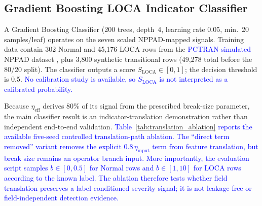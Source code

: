 \documentclass[journal]{IEEEtran}
\newcommand{\added}[1]{\textcolor{blue}{#1}}
\begin{document}
\begin{table}[htbp]
\caption{NPPAD-Mapped Indicators: Qualitative Trend Under Increasing LOCA Severity (Mapped proxy values from synthetic benchmark; not raw plant measurements.)}
\label{tab:nppad}
\centering
{}
\end{table}

\subsection{Gradient Boosting LOCA Indicator Classifier}

A Gradient Boosting Classifier (200 trees, depth~4, learning rate 0.05, min.\ 20 samples/leaf) operates on the seven scaled NPPAD-mapped signals. Training data contain 302 Normal and 45,176 LOCA rows from the \added{PCTRAN-simulated} NPPAD dataset \cite{qi2022nppad}, plus 3,800 synthetic transitional rows (49,278 total before the 80/20 split). The classifier outputs a score $S_{\mathrm{LOCA}}\in[0,1]$; the decision threshold is 0.5. \added{No calibration study is available, so $S_{\mathrm{LOCA}}$ is not interpreted as a calibrated probability.}

Because $\eta_\text{eff}$ derives 80\% of its signal from the prescribed break-size parameter, the main classifier result is an indicator-translation demonstration rather than independent end-to-end validation.  \added{Table~\ref{tab:translation_ablation} reports the available five-seed controlled translation-path ablation. The ``direct term removed'' variant removes the explicit $0.8\,\eta_\mathrm{input}$ term from feature translation, but break size remains an operator branch input. More importantly, the evaluation script samples $b\in[0,0.5]$ for Normal rows and $b\in[1,10]$ for LOCA rows according to the known label. The ablation therefore tests whether field translation preserves a label-conditioned severity signal; it is not leakage-free or field-independent detection evidence.}
\end{document}
